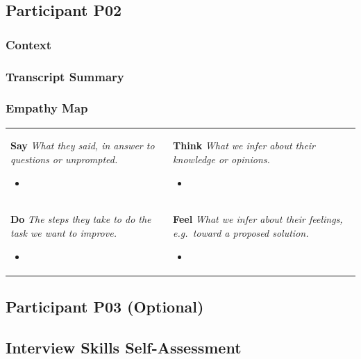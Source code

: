 \documentclass[12pt]{article}
\newcommand{\empathymap}[5]{%
  \begin{center}
  \renewcommand{\arraystretch}{1.3}
  \begin{tabularx}{\textwidth}{|>{\raggedright\arraybackslash}X|>{\raggedright\arraybackslash}X|}
    \multicolumn{2}{c}{\textbf{Empathy Map --- #1}}\\
    \hline
    \textbf{Say} \newline \footnotesize\emph{What they said, in answer to questions or unprompted.} \normalsize #2
    &
    \textbf{Think} \newline \footnotesize\emph{What we infer about their knowledge or opinions.} \normalsize #3
    \\ \hline
    \textbf{Do} \newline \footnotesize\emph{The steps they take to do the task we want to improve.} \normalsize #4
    &
    \textbf{Feel} \newline \footnotesize\emph{What we infer about their feelings, e.g.\ toward a proposed solution.} \normalsize #5
    \\ \hline
  \end{tabularx}
  \end{center}}
\begin{document}
\subsection{Participant P02} \label{sec:P02}

\subsubsection{Context}

\subsubsection{Transcript Summary}

\subsubsection{Empathy Map}

\empathymap{P02}
{\begin{itemize}[leftmargin=*,nosep] \item \todo{} \end{itemize}}
{\begin{itemize}[leftmargin=*,nosep] \item \todo{} \end{itemize}}
{\begin{itemize}[leftmargin=*,nosep] \item \todo{} \end{itemize}}
{\begin{itemize}[leftmargin=*,nosep] \item \todo{} \end{itemize}}

\subsection{Participant P03 (Optional)} \label{sec:P03}


\subsection{Interview Skills Self-Assessment} \label{SecSkills}
\end{document}
